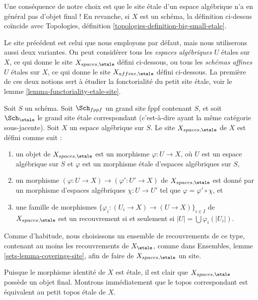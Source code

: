 \noindent
Une conséquence de notre choix est que le site \'etale d'un espace algébrique
n'a en général pas d'objet final ! En revanche, si $X$ est
un schéma, la définition ci-dessus coïncide avec
Topologies, définition \ref{topologies-definition-big-small-etale}.

\medskip\noindent
Le site précédent est celui que nous employons par défaut, mais nous utiliserons aussi
deux variantes. On peut considérer tous les {\it espaces algébriques}
$U$ \'etales sur $X$, ce qui donne le site
$X_{spaces, \etale}$ défini ci-dessous, ou tous les {\it schémas affines}
$U$ \'etales sur $X$, ce qui donne le site
$X_{affine, \etale}$ défini ci-dessous. La première de ces deux notions
sert à étudier la fonctorialité du petit site \'etale, voir le
lemme \ref{lemma-functoriality-etale-site}.

\begin{definition}
\label{definition-spaces-etale-site}
Soit $S$ un schéma.
Soit $\Sch_{fppf}$ un grand site fppf contenant $S$,
et soit $\Sch_\etale$ le grand site \'etale correspondant
(c'est-à-dire ayant la même catégorie sous-jacente).
Soit $X$ un espace algébrique sur $S$.
Le site {\it $X_{spaces, \etale}$} de $X$ est défini comme suit :
\begin{enumerate}
\item un objet de $X_{spaces, \etale}$ est un morphisme
$\varphi : U \to X$, où $U$ est un espace algébrique sur $S$ et
$\varphi$ est un morphisme \'etale d'espaces algébriques sur $S$,
\item un morphisme $(\varphi : U \to X) \to (\varphi' : U' \to X)$ de
$X_{spaces, \etale}$ est donné par un morphisme d'espaces algébriques
$\chi : U \to U'$ tel que $\varphi = \varphi' \circ \chi$, et
\item une famille de morphismes
$\{\varphi_i : (U_i \to X) \to (U \to X)\}_{i \in I}$
de $X_{spaces, \etale}$ est un recouvrement si et seulement si
$|U| = \bigcup \varphi_i(|U_i|)$.
\end{enumerate}
Comme d'habitude, nous choisissons un ensemble de recouvrements de ce type, contenant au moins
les recouvrements de $X_\etale$, comme dans
Ensembles, lemme \ref{sets-lemma-coverings-site},
afin de faire de $X_{spaces, \etale}$ un site.
\end{definition}

\noindent
Puisque le morphisme identité de $X$ est \'etale, il est clair que
$X_{spaces, \etale}$ possède un objet final.
Montrons immédiatement que le topos correspondant est équivalent au
petit topos \'etale de $X$.


